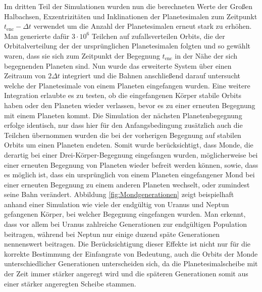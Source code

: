 \documentclass[12pt,a4paper,twoside]{article}
\renewcommand{\cite}{\citep}
\begin{document}
Im dritten Teil der Simulationen wurden nun die berechneten Werte der Großen Halbachsen, Exzentrizitäten und Inklinationen der Planetesimalen zum Zeitpunkt $t_{\mathrm{enc}}-\Delta t$ verwendet um die Anzahl der Planetesimalen erneut stark zu erhöhen. Man generierte dafür $3 \cdot 10^6$ Teilchen auf zufallsverteilen Orbits, die der Orbitalverteilung der der ursprünglichen Planetesimalen folgten und so gewählt waren, dass sie sich zum Zeitpunkt der Begegnung $t_{\mathrm{enc}}$ in der Nähe der sich begegnenden Planeten sind. %
Nun wurde das erweiterte System über einen Zeitraum von $2 \Delta t$ integriert und die Bahnen anschließend darauf untersucht welche der Planetesimale von einem Planeten eingefangen wurden. %
Eine weitere Integration erlaubte es zu testen, ob die eingefangenen Körper stabile Orbits haben oder den Planeten wieder verlassen, bevor es zu einer erneuten Begegnung mit einem Planeten kommt.
Die Simulation der nächsten Planetenbegegnung erfolge identisch, nur dass hier für den Anfangsbedingung zusätzlich auch die Teilchen übernommen wurden die bei der vorherigen Begegnung auf stabilen Orbits um einen Planeten endeten.
Somit wurde berücksichtigt, dass Monde, die derartig bei einer Drei-Körper-Begegnung eingefangen wurden, möglicherweise bei einer erneuten Begegnung von Planeten wieder befreit werden können, sowie, dass es möglich ist, dass ein ursprünglich von einem Planeten eingefangener Mond bei einer erneuten Begegnung zu einem anderen Planeten wechselt, oder zumindest seine Bahn verändert\cite{Nesvorny2007}. %
Abbildung \ref{fig:Mondgenerationen} zeigt beispielhaft anhand einer Simulation wie viele der endgültig von Uranus und Neptun gefangenen Körper, bei welcher Begegnung eingefangen wurden.
Man erkennt, dass vor allem bei Uranus zahlreiche Generationen zur endgültigen Population beitragen, während bei Neptun nur einige duzend späte Generationen nennenswert beitragen.
Die Berücksichtigung dieser Effekte ist nicht nur für die korrekte Bestimmung der Einfangrate von Bedeutung, auch die Orbits der Monde unterschiedlicher Generationen unterscheiden sich, da die Planetesimalscheibe mit der Zeit immer stärker angeregt wird und die späteren Generationen somit aus einer stärker angeregten Scheibe stammen\cite{Nesvorny2007}.
\end{document}
